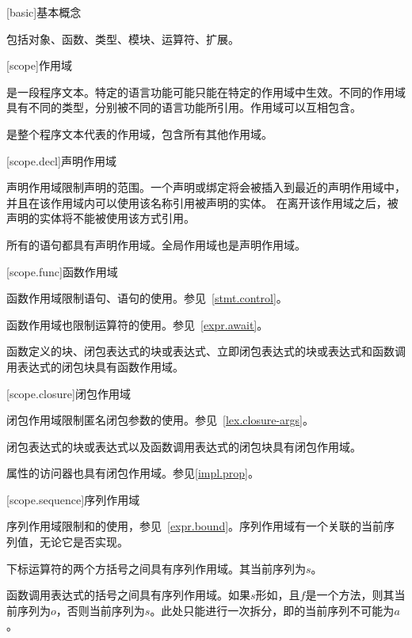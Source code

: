 
[basic]{基本概念}

\pnum
{}包括对象、函数、类型、模块、运算符、扩展。

[scope]{作用域}

\pnum
{}是一段程序文本。特定的语言功能可能只能在特定的作用域中生效。不同的作用域具有不同的类型，分别被不同的语言功能所引用。作用域可以互相包含。

\pnum
{}是整个程序文本代表的作用域，包含所有其他作用域。

[scope.decl]{声明作用域}

\pnum
声明作用域限制声明的范围。一个声明或绑定将会被插入到最近的声明作用域中，并且在该作用域内可以使用该名称引用被声明的实体。
在离开该作用域之后，被声明的实体将不能被使用该方式引用。

\pnum
所有的语句都具有声明作用域。全局作用域也是声明作用域。

[scope.func]{函数作用域}

\pnum
函数作用域限制语句、语句的使用。参见~\ref{stmt.control}。

\pnum
函数作用域也限制运算符的使用。参见~\ref{expr.await}。

\pnum
函数定义的块、闭包表达式的块或表达式、立即闭包表达式的块或表达式和函数调用表达式的闭包块具有函数作用域。

[scope.closure]{闭包作用域}

\pnum
闭包作用域限制匿名闭包参数的使用。参见~\ref{lex.closure-args}。

\pnum
闭包表达式的块或表达式以及函数调用表达式的闭包块具有闭包作用域。

\pnum
属性的访问器也具有闭包作用域。参见\ref{impl.prop}。

[scope.sequence]{序列作用域}

\pnum
序列作用域限制\tcode{\textasciicircum}和\tcode{\$}的使用，参见~\ref{expr.bound}。序列作用域有一个关联的当前序列值，无论它是否实现。

\pnum
下标运算符的两个方括号之间具有序列作用域。其当前序列为$s$。

\pnum
函数调用表达式的括号之间具有序列作用域。如果$s$形如，且$f$是一个方法，则其当前序列为$o$，否则当前序列为$s$。\enternote 此处只能进行一次拆分，即的当前序列不可能为$a$。\exitnote


